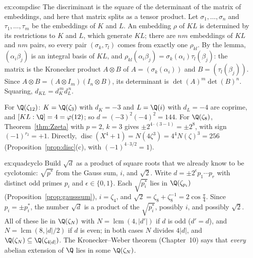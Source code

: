 \begin{solution}{ex:compdisc}
\idea The discriminant is the square of the determinant of the matrix of embeddings, and here that matrix splits as a tensor
product.
\writeup Let $\sigma_1,\dots,\sigma_n$ and $\tau_1,\dots,\tau_m$ be the embeddings of $K$ and $L$. An embedding $\rho$ of $KL$ is
determined by its restrictions to $K$ and $L$, which generate $KL$; there are $nm$ embeddings of $KL$ and $nm$ pairs, so every
pair $(\sigma_k,\tau_l)$ comes from exactly one $\rho_{kl}$. By the lemma, $(\alpha_i\beta_j)$ is an integral basis of $KL$, and
$\rho_{kl}(\alpha_i\beta_j)=\sigma_k(\alpha_i)\tau_l(\beta_j)$: the matrix is the Kronecker product $A\otimes B$ of
$A=(\sigma_k(\alpha_i))$ and $B=(\tau_l(\beta_j))$. Since $A\otimes B=(A\otimes I_m)(I_n\otimes B)$, its determinant is
$\det(A)^m\det(B)^n$. Squaring, $d_{KL}=d_K^{\,m}d_L^{\,n}$.

For $\Q(\zeta_{12})$: $K=\Q(\zeta_3)$ with $d_K=-3$ and $L=\Q(i)$ with $d_L=-4$ are coprime, and $[KL:\Q]=4=\varphi(12)$; so
$d=(-3)^2(-4)^2=144$. For $\Q(\zeta_8)$, Theorem~\ref{thm:Zzeta} with $p=2$, $k=3$ gives $\pm2^{4\cdot(3-1)}=\pm2^8$, with sign
$(-1)^{r_2}=+1$. Directly, $\operatorname{disc}(X^4+1)=N(4\zeta^3)=4^4N(\zeta)^3=256$ (Proposition~\ref{prop:disc}(c), with
$(-1)^{4\cdot3/2}=1$).
\end{solution}

\begin{solution}{ex:quadcyclo}
\idea Build $\sqrt d$ as a product of square roots that we already know to be cyclotomic: $\sqrt{p^*}$ from the Gauss sum,
$i$, and $\sqrt2$.
\writeup Write $d=\pm2^{\epsilon}p_1\cdots p_r$ with distinct odd primes $p_i$ and $\epsilon\in\{0,1\}$. Each $\sqrt{p_i^*}$ lies
in $\Q(\zeta_{p_i})$ (Proposition~\ref{prop:gausssum}), $i=\zeta_4$, and $\sqrt2=\zeta_8+\zeta_8^{-1}=2\cos\frac\pi4$. Since
$p_i=\pm p_i^*$, the number $\sqrt d$ is a product of the $\sqrt{p_i^*}$, possibly $i$, and possibly $\sqrt2$. All of these lie
in $\Q(\zeta_N)$ with $N=\operatorname{lcm}(4,|d'|)$ if $d$ is odd ($d'=d$), and $N=\operatorname{lcm}(8,|d|/2)$ if $d$ is
even; in both cases $N$ divides $4|d|$, and $\Q(\zeta_N)\subseteq\Q(\zeta_{4|d|})$. The Kronecker--Weber theorem (Chapter~10)
says that \emph{every} abelian extension of $\Q$ lies in some $\Q(\zeta_N)$.
\end{solution}

